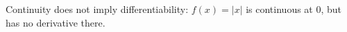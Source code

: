 \documentclass{article}
\begin{document}
\begin{counterexample}
Continuity does not imply differentiability: $f(x)=|x|$ is continuous at
$0$, but has no derivative there.
\end{counterexample}
\end{document}
